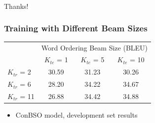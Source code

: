 \documentclass{beamer}
\begin{document}
\begin{frame}
\begin{center}
Thanks!
\end{center}
\end{frame}

\begin{frame}
\frametitle{Training with Different Beam Sizes}
\begin{table}
 \small
  \centering
  \begin{tabular}{lccc}
    \toprule
    & \multicolumn{3}{c}{Word Ordering Beam Size (BLEU) } \\ 
    &  $K_{te}$ = 1 & $K_{te}$ = 5 & $K_{te}$ = 10 \\ 
    \midrule
    $K_{tr}$ = 2 & 30.59 & 31.23 & 30.26 \\
    $K_{tr}$ = 6 & 28.20 & 34.22 & 34.67 \\
    $K_{tr}$ = 11 & 26.88 & 34.42 & 34.88 \\   
    \bottomrule
  \end{tabular}
\end{table}

\begin{itemize}
\item ConBSO model, development set results
\end{itemize}
\end{frame}
\end{document}
